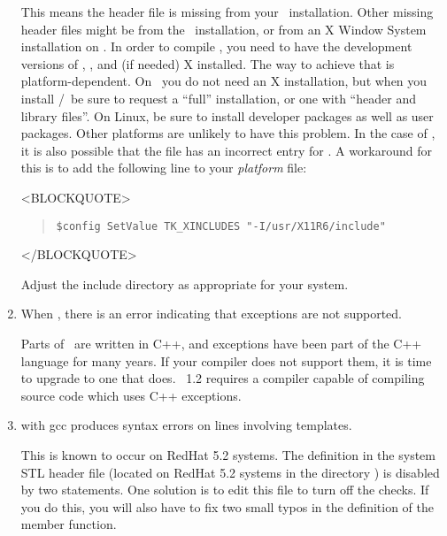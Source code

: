 \begin{enumerate}
This means the header file  is missing from your
\Tcl\ installation.  Other missing header files might be
 from the \Tk\ installation, or  from an
X Window System installation on \Unix.  In order to compile \OOMMF, you
need to have the development versions of \Tcl, \Tk, and (if needed) X
installed.  The way to achieve that is platform-dependent.  On \Windows\
you do not need an X installation, but when you install \Tcl/\Tk\ be
sure to request a ``full'' installation, or one with ``header and
library files''.  On Linux, be sure to install developer packages
as well as user packages.  Other
platforms are unlikely to have this problem.  In the case of
, it is also possible that the  file has an
incorrect entry for \cd{TK\_XINCLUDES}.  A workaround for this is to
add the following line to your
\textit{platform} file:
\begin{rawhtml}
<BLOCKQUOTE>
\end{rawhtml}
\begin{quote}
\begin{verbatim}
$config SetValue TK_XINCLUDES "-I/usr/X11R6/include"
\end{verbatim}
\end{quote}
\begin{rawhtml}
</BLOCKQUOTE>
\end{rawhtml}
Adjust the include directory as appropriate for your system.

\item When
, there is an error
indicating that exceptions are not supported.

Parts of \OOMMF\ are written in C++, and exceptions have been part
of the C++ language for many years.  If your compiler does not
support them, it is time to upgrade to one that does.  \OOMMF\ 1.2
requires a compiler capable of compiling source code which uses
C++ exceptions.

\item {} with gcc produces syntax errors
on lines involving  templates.

This is known to occur on RedHat 5.2 systems.  The 
definition in the system STL header file \cd{memory} (located on RedHat
5.2 systems in the directory \cd{/usr/include/g++}) is disabled by two
 statements.  One solution is to edit this file to turn off
the \cd{\lb if} checks.  If you do this, you will also have to fix two
small typos in the definition of the \cd{release()} member function.


\end{enumerate}
